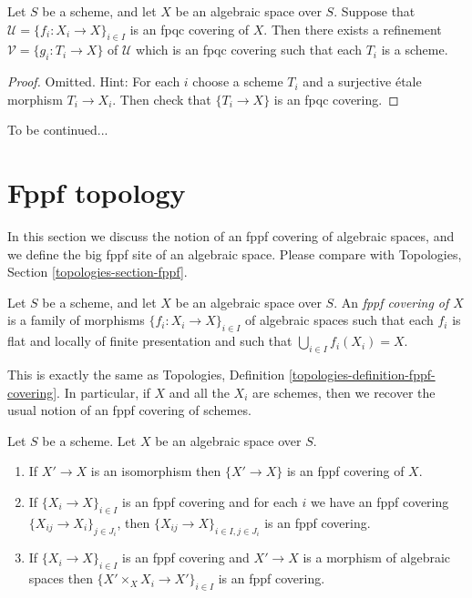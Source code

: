 \begin{lemma}
\label{lemma-refine-fpqc-schemes}
Let $S$ be a scheme, and let $X$ be an algebraic space over $S$.
Suppose that $\mathcal{U} = \{f_i : X_i \to X\}_{i \in I}$ is an
fpqc covering of $X$. Then there exists a refinement
$\mathcal{V} = \{g_i : T_i \to X\}$ of $\mathcal{U}$ which is an
fpqc covering such that each $T_i$ is a scheme.
\end{lemma}

\begin{proof}
Omitted. Hint: For each $i$ choose a scheme $T_i$ and a surjective \'etale
morphism $T_i \to X_i$. Then check that $\{T_i \to X\}$ is an fpqc covering.
\end{proof}

\noindent
To be continued...




\section{Fppf topology}
\label{section-fppf}

\noindent
In this section we discuss the notion of an fppf covering of algebraic spaces,
and we define the big fppf site of an algebraic space. Please compare with
Topologies, Section \ref{topologies-section-fppf}.

\begin{definition}
\label{definition-fppf-covering}
Let $S$ be a scheme, and let $X$ be an algebraic space over $S$.
An {\it fppf covering of $X$} is a family of morphisms
$\{f_i : X_i \to X\}_{i \in I}$ of algebraic spaces
such that each $f_i$ is flat and locally of finite presentation
and such that $\bigcup_{i \in I} f_i(X_i) = X$.
\end{definition}

\noindent
This is exactly the same as
Topologies, Definition \ref{topologies-definition-fppf-covering}.
In particular, if $X$ and all the $X_i$ are schemes, then we recover the usual
notion of an fppf covering of schemes.

\begin{lemma}
\label{lemma-fppf}
Let $S$ be a scheme.
Let $X$ be an algebraic space over $S$.
\begin{enumerate}
\item If $X' \to X$ is an isomorphism then $\{X' \to X\}$
is an fppf covering of $X$.
\item If $\{X_i \to X\}_{i\in I}$ is an fppf covering and for each
$i$ we have an fppf covering $\{X_{ij} \to X_i\}_{j\in J_i}$, then
$\{X_{ij} \to X\}_{i \in I, j\in J_i}$ is an fppf covering.
\item If $\{X_i \to X\}_{i\in I}$ is an fppf covering
and $X' \to X$ is a morphism of algebraic spaces then
$\{X' \times_X X_i \to X'\}_{i\in I}$ is an fppf covering.
\end{enumerate}
\end{lemma}


